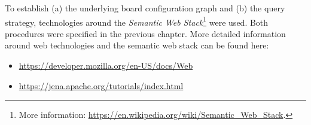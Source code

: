 To establish (a) the underlying board configuration graph and (b) the query strategy, technologies around the \textit{Semantic Web Stack}\footnote{More information: \url{https://en.wikipedia.org/wiki/Semantic_Web_Stack}.} were used. Both procedures were specified in the previous chapter. More detailed information around web technologies and the semantic web stack can be found here: 

\begin{itemize}%
    \setlength\itemsep{-0.5em}
    \item \url{https://developer.mozilla.org/en-US/docs/Web}
    \item \url{https://jena.apache.org/tutorials/index.html}
\end{itemize}
